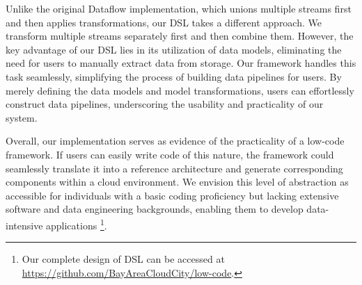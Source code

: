 Unlike the original Dataflow implementation, which unions multiple streams first and then applies transformations, our DSL takes a different approach. We transform multiple streams separately first and then combine them. However, the key advantage of our DSL lies in its utilization of data models, eliminating the need for users to manually extract data from storage. Our framework handles this task seamlessly, simplifying the process of building data pipelines for users. By merely defining the data models and model transformations, users can effortlessly construct data pipelines, underscoring the usability and practicality of our system.

Overall, our implementation serves as evidence of the practicality of a low-code framework. If users can easily write code of this nature, the framework could seamlessly translate it into a reference architecture and generate corresponding components within a cloud environment. We envision this level of abstraction as accessible for individuals with a basic coding proficiency but lacking extensive software and data engineering backgrounds, enabling them to develop data-intensive applications \footnote{Our complete design of DSL can be accessed at \url{https://github.com/BayAreaCloudCity/low-code}.}.

